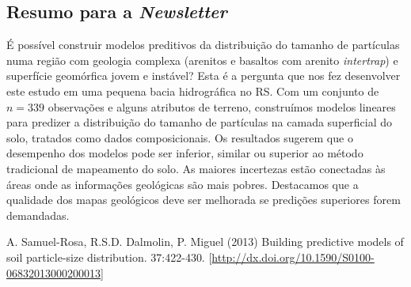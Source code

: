 \subsection{Resumo para a \textit{Newsletter}}
É possível construir modelos preditivos da distribuição do tamanho de partículas numa região com geologia complexa (arenitos e basaltos com arenito \emph{intertrap}) e superfície geomórfica jovem e instável? Esta é a pergunta que nos fez desenvolver este estudo em uma pequena bacia hidrográfica no RS. Com um conjunto de $n=339$ observações e alguns atributos de terreno, construímos modelos lineares para predizer a distribuição do tamanho de partículas na camada superficial do solo, tratados como dados composicionais. Os resultados sugerem que o desempenho dos modelos pode ser inferior, similar ou superior ao método tradicional de mapeamento do solo. As maiores incertezas estão conectadas às áreas onde as informações geológicas são mais pobres. Destacamos que a qualidade dos mapas geológicos deve ser melhorada se predições superiores forem demandadas.
\begin{footnotesize}
\begin{thebibliography}{99}
A. Samuel-Rosa, R.S.D. Dalmolin, P. Miguel (2013)
\newblock Building predictive models of soil particle-size distribution.
 37:422-430. [\url{http://dx.doi.org/10.1590/S0100-06832013000200013}]
\end{thebibliography}
\end{footnotesize}
\address{Jean Michel Moura-Bueno\\
  Universidade Federal de Santa Maria\\
  }
